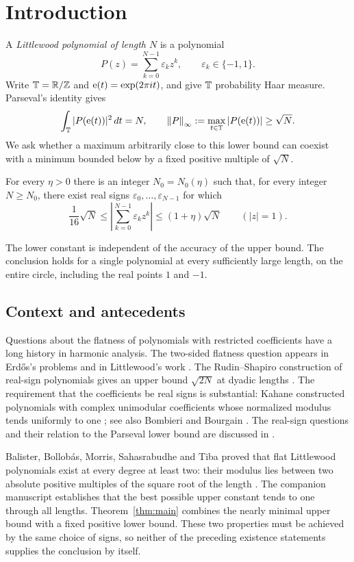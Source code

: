 \section{Introduction}\label{sec:introduction}
A \emph{Littlewood polynomial of length $N$} is a polynomial
\[
 P(z)=\sum_{k=0}^{N-1}\varepsilon_kz^k,
 \qquad \varepsilon_k\in\{-1,1\}.
\]
Write $\mathbb T=\mathbb R/\mathbb Z$ and $\mathrm e(t)=\exp(2\pi i t)$, and give $\mathbb T$ probability
Haar measure. Parseval's identity gives
\[
 \int_{\mathbb T}|P(\mathrm e(t))|^2\,dt=N,
 \qquad
 \left\lVert P\right\rVert_\infty:=\max_{t\in\mathbb T}|P(\mathrm e(t))|\ge\sqrt N.
\]
We ask whether a maximum arbitrarily close to this lower bound can
coexist with a minimum bounded below by a fixed positive multiple of
$\sqrt N$.

\begin{theorem}\label{thm:main}
For every $\eta>0$ there is an integer $N_0=N_0(\eta)$ such that, for every
integer $N\ge N_0$, there exist real signs
$\varepsilon_0,\ldots,\varepsilon_{N-1}$ for which
\[
 \frac1{16}\sqrt N
 \le\left|\sum_{k=0}^{N-1}\varepsilon_kz^k\right|
 \le(1+\eta)\sqrt N
 \qquad (|z|=1).
\]
\end{theorem}

The lower constant is independent of the accuracy of the upper bound.
The conclusion holds for a single polynomial at every sufficiently large
length, on the entire circle, including the real points $1$ and $-1$.

\subsection{Context and antecedents}
Questions about the flatness of polynomials with restricted coefficients
have a long history in harmonic analysis. The two-sided flatness question
appears in Erd\H{o}s's problems \cite[Problem 26]{Erdos1957} and in
Littlewood's work \cite{Littlewood1966}. The Rudin--Shapiro construction
of real-sign polynomials gives an upper bound $\sqrt{2N}$ at dyadic lengths
\cite{Rudin1959}. The requirement that the coefficients be real signs is
substantial: Kahane constructed polynomials with complex unimodular
coefficients whose normalized modulus tends uniformly to one
\cite{Kahane1980}; see also Bombieri and Bourgain
\cite{BombieriBourgain2009}. The real-sign questions and their relation to
the Parseval lower bound are discussed in
\cite[Problems 4.13 and 4.31]{HaymanLingham2018}.

Balister, Bollob\'as, Morris, Sahasrabudhe and Tiba proved that flat
Littlewood polynomials exist at every degree at least two: their modulus lies between
two absolute positive multiples of the square root of the length
\cite[Theorem 1.1]{BalisterEtAl2020}. The companion manuscript
\cite{OpenAIMinimal} establishes that the best possible upper constant
tends to one through all lengths. Theorem~\ref{thm:main} combines the
nearly minimal upper bound with a fixed positive lower bound. These two
properties must be achieved by the same choice of signs, so neither of the
preceding existence statements supplies the conclusion by itself.

